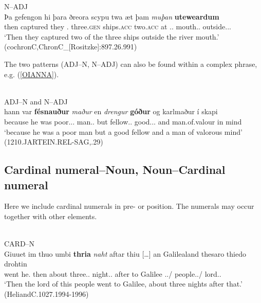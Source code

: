 \documentclass[output=paper,colorlinks,citecolor=brown,draft]{langscibook}
\begin{document}
\ea\label{OENA2}
N--ADJ\\
\gll Þa gefengon hi þara ðreora scypu twa æt þam \textit{muþan} \textbf{uteweardum}\\
	then captured they \DEF.\GEN{} three.\textsc{gen} ships.\textsc{acc} two.\textsc{acc} at \DEF.\DAT.\SG{} mouth.\DAT.\SG{} 	outside.\DAT.\SG.\STR{}\\
\glt ‘Then they captured two of the three ships outside the river mouth.’ (cochronC,ChronC\_[Rositzke]:897.26.991)
\z



The two patterns (ADJ–N, N–ADJ) can also be found within a complex  phrase, e.g. (\ref{OIANNA}). 


\ea\label{OIANNA}
\noindent {}\medskip\\
ADJ--N and N--ADJ\\
 hann var \textbf{fésnauður} \textit{maður} en \textit{drengur} \textbf{góður} og karlmaður í skapi\\
because he was poor.\NOM.\SG.\STR{} man.\NOM.\SG{} but fellow.\NOM.\SG{} good.\NOM.\SG.\STR{} and man.of.valour in mind\\
\glt ‘because he was a poor man but a good fellow and a man of valorous mind’ (1210.JARTEIN.REL-SAG,.29)
\z

\subsection{Cardinal numeral–Noun, Noun–Cardinal numeral}\label{ssectCaNNCa}

Here we include cardinal numerals in pre- or  position. The numerals may occur together with other elements.


\ea\label{OSCardN}
\\
\ea CARD--N\\
\gll Giuuet im thuo umbi \textbf{thria} \textit{naht} aftar thiu […] an Galilealand thesaro thiedo drohtin\\
went he.\DAT{} then about three.\ACC.\PL{} night.\ACC.\PL{} after \DEM{} {} to Galilee \DEM.\GEN.\SG/\PL{} people.\GEN.\SG/\PL{} lord.\NOM.\SG{}\\
\glt ‘Then the lord of this people went to Galilee, about three nights after that.’ (HeliandC.1027.1994-1996)
\end{document}
